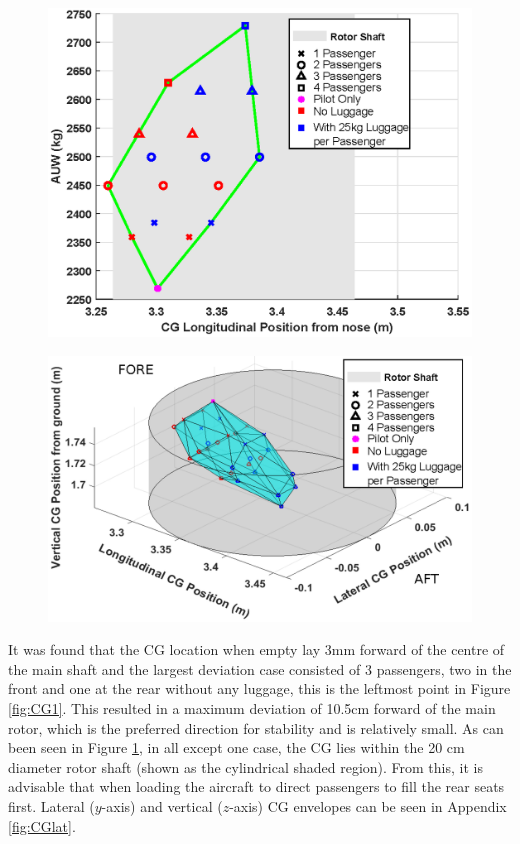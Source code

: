 \documentclass[11pt,a4paper]{article}
\begin{document}
\begin{figure}[H]
\centering
\begin{minipage}{.5\textwidth}
  \centering
  \includegraphics[width=\linewidth]{CGLONGVAUW.eps}
  \label{fig:CG1}
\end{minipage}%
\begin{minipage}{.5\textwidth}
  \centering
  \includegraphics[width=\linewidth]{CG3D.eps}
  \label{fig:CG2}
\end{minipage}
\end{figure}

It was found that the CG location when empty lay 3mm forward of the centre of the main shaft and the largest deviation case consisted of 3 passengers, two in the front and one at the rear without any luggage, this is the leftmost point in Figure \ref{fig:CG1}. This resulted in a maximum deviation of 10.5cm forward of the main rotor, which is the preferred direction for stability and is relatively small\cite{prouty}. As can been seen in Figure \ref{fig:CG2}, in all except one case, the CG lies within the 20 cm diameter rotor shaft (shown as the cylindrical shaded region). From this, it is advisable that when loading the aircraft to direct passengers to fill the rear seats first. Lateral ($y$-axis) and vertical ($z$-axis) CG envelopes can be seen in Appendix \ref{fig:CGlat}.
\end{document}
